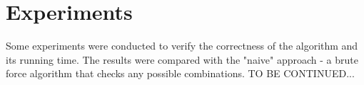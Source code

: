 \label{Experiments}
\section{Experiments}


Some experiments were conducted to verify the correctness of the algorithm and its running time. The results were compared with the "naive" approach - a brute force algorithm that checks any possible combinations. 
 TO BE CONTINUED...

